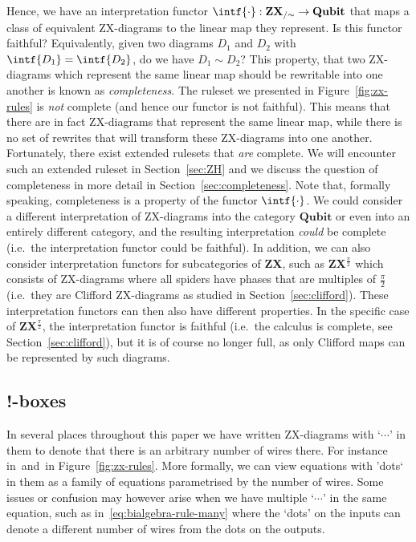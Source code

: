 \documentclass[a4paper,onecolumn,superscriptaddress,11pt,%
				unpublished,%
				allowfontchageintitle,%
				]{quantumarticle}
\begin{document}
Hence, we have an interpretation functor $\intf{\cdot}:\textbf{ZX}_{/\sim}\rightarrow \textbf{Qubit}$ that maps a class of equivalent ZX-diagrams to the linear map they represent. 
Is this functor faithful? Equivalently, given two diagrams $D_1$ and $D_2$ with $\intf{D_1}=\intf{D_2}$, do we have $D_1\sim D_2$?
This property, that two ZX-diagrams which represent the same linear map should be rewritable into one another is known as \emph{completeness}.
The ruleset we presented in Figure~\ref{fig:zx-rules} is \emph{not} complete (and hence our functor is not faithful). This means that there are in fact ZX-diagrams that represent the same linear map, while there is no set of rewrites that will transform these ZX-diagrams into one another.
Fortunately, there exist extended rulesets that \emph{are} complete. We will encounter such an extended ruleset in Section~\ref{sec:ZH} and we discuss the question of completeness in more detail in Section~\ref{sec:completeness}.
Note that, formally speaking, completeness is a property of the functor $\intf{\cdot}$. We could consider a different interpretation of ZX-diagrams into the category $\textbf{Qubit}$ or even into an entirely different category, and the resulting interpretation \emph{could} be complete (i.e.~the interpretation functor could be faithful). 
In addition, we can also consider interpretation functors for subcategories of \textbf{ZX}, such as \textbf{ZX}$^{\frac{\pi}{2}}$ which consists of ZX-diagrams where all spiders have phases that are multiples of $\frac\pi2$ (i.e.~they are Clifford ZX-diagrams as studied in Section~\ref{sec:clifford}). These interpretation functors can then also have different properties. In the specific case of \textbf{ZX}$^{\frac{\pi}{2}}$, the interpretation functor is faithful (i.e.~the calculus is complete, see Section~\ref{sec:clifford}), but it is of course no longer full, as only Clifford maps can be represented by such diagrams.

\subsection{!-boxes}

In several places throughout this paper we have written ZX-diagrams with `$\cdots$' in them to denote that there is an arbitrary number of wires there. For instance in~\SpiderRule and~\CopyRule in Figure~\ref{fig:zx-rules}. More formally, we can view equations with 'dots` in them as a family of equations parametrised by the number of wires. 
Some issues or confusion may however arise when we have multiple `$\cdots$' in the same equation, such as in~\eqref{eq:bialgebra-rule-many} where the `dots' on the inputs can denote a different number of wires from the dots on the outputs. 
\end{document}
